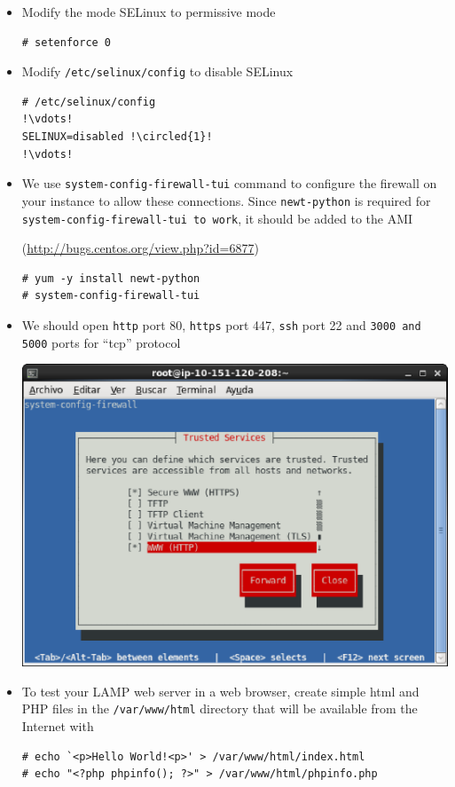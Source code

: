 \documentclass{beamer}
\newcommand*\circled[1]{\tikz[baseline=(char.base)]{
            \node[shape=circle,draw,inner sep=2pt] (char) {#1};}}
\begin{document}
\begin{frame}
\begin{itemize}
\item Modify the mode SELinux to permissive mode
\lstset{language=shell}
\begin{lstlisting}[escapechar=!]
# setenforce 0
\end{lstlisting}

\item Modify \texttt{/etc/selinux/config} to disable SELinux

\lstset{language=shell}
\begin{lstlisting}[escapechar=!]
# /etc/selinux/config
!\vdots!
SELINUX=disabled !\circled{1}!
!\vdots!
\end{lstlisting}

\item We use \texttt{system-config-firewall-tui} command to configure the firewall on your instance to allow these connections. 
Since \texttt{newt-python} is required for \texttt{system-config-firewall-tui to work}, it should be added to the AMI

(\href{http://bugs.centos.org/view.php?id=6877}{http://bugs.centos.org/view.php?id=6877})
\lstset{language=shell}
\begin{lstlisting}[escapechar=!]
# yum -y install newt-python 
# system-config-firewall-tui
\end{lstlisting}

\item We should open \texttt{http} port 80, \texttt{https} port 447,  \texttt{ssh} port 22 and \texttt{\alert{3000 and 5000}} ports for ``tcp'' protocol
 
\includegraphics[width=0.5 \textwidth]{system-config-firewall-tui.eps}

\item To test your LAMP web server in a web browser,  create simple html and PHP files in the \texttt{/var/www/html} directory that will be available from the Internet with
\lstset{language=shell}
\begin{lstlisting}[escapechar=&]
# echo `<p>Hello World!<p>' > /var/www/html/index.html
# echo "<?php phpinfo(); ?>" > /var/www/html/phpinfo.php
\end{lstlisting}



\end{itemize}
\end{frame}
\end{document}

